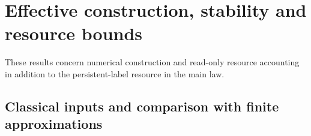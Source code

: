 \documentclass[11pt]{amsart}
\theoremstyle{definition}\newtheorem{definition}[theorem]{Definition}
\theoremstyle{remark}\newtheorem{remark}[theorem]{Remark}
\begin{document}
\section{Effective construction, stability and resource bounds}
\label{app:effective}
These results concern numerical construction and read-only resource
accounting in addition to the persistent-label resource in the main law.
\begingroup
\let\section\subsection
\let\subsection\subsubsection
\let\subsubsection\paragraph





\endgroup
\section{Classical inputs and comparison with finite approximations}
\label{app:comparison}\label{sec:literature-comparison}




\end{document}

